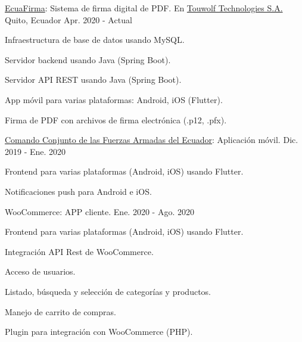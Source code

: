 
\begin{cventries}

  \cventry
    {\href{https://ecuafirma.com}{EcuaFirma}: Sistema de firma digital de PDF.} %
    {En \href{https://touwolf.com/}{Touwolf Technologies S.A.}} %
    {Quito, Ecuador} %
    {Apr. 2020 - Actual} %
    {
      \begin{cvitems} %
        \item {Infraestructura de base de datos usando MySQL.}
        \item {Servidor backend usando Java (Spring Boot).}
        \item {Servidor API REST usando Java (Spring Boot).}
        \item {App móvil para varias plataformas: Android, iOS (Flutter).}
        \item {Firma de PDF con archivos de firma electrónica (.p12, .pfx).}
      \end{cvitems}
    }

  \cventry
    {\href{https://www.ccffaa.mil.ec/}{Comando Conjunto de las Fuerzas Armadas del Ecuador}: Aplicación móvil.} %
    {} %
    {} %
    {Dic. 2019 - Ene. 2020} %
    {
      \begin{cvitems} %
        \item {Frontend para varias plataformas (Android, iOS) usando Flutter.}
        \item {Notificaciones push para Android e iOS.}
      \end{cvitems}
    }

  \cventry
    {WooCommerce: APP cliente.} %
    {} %
    {} %
    {Ene. 2020 - Ago. 2020} %
    {
      \begin{cvitems} %
        \item {Frontend para varias plataformas (Android, iOS) usando Flutter.}
        \item {Integración API Rest de WooCommerce.}
        \item {Acceso de usuarios.}
        \item {Listado, búsqueda y selección de categorías y productos.}
        \item {Manejo de carrito de compras.}
        \item {Plugin para integración con WooCommerce (PHP).}
      \end{cvitems}
    }


\end{cventries}
